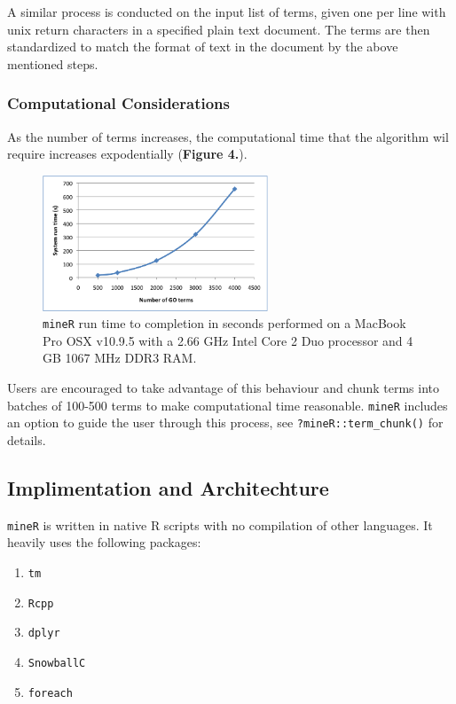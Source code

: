 \documentclass[twoside]{article}
\begin{document}
A similar process is conducted on the input list of terms, given one per line with unix return characters in a specified plain text document. The terms are then standardized to match the format of text in the document by the above mentioned steps.

\subsubsection{Computational Considerations}

As the number of terms increases, the computational time that the algorithm wil require increases expodentially (\textbf{Figure 4.}).

\begin{figure}[h]
\centering
\includegraphics[width=0.6\textwidth]{GO_np.png}
\caption{\texttt{mineR} run time to completion in seconds performed on a MacBook Pro OSX v10.9.5 with a 2.66 GHz Intel Core 2 Duo processor and 4 GB 1067 MHz DDR3 RAM.}
\end{figure}

Users are encouraged to take advantage of this behaviour and chunk terms into batches of 100-500 terms to make computational time reasonable. \texttt{mineR} includes an option to guide the user through this process, see \texttt{?mineR::term_chunk()} for details.

\subsection{Implimentation and Architechture}

\texttt{mineR} is written in native R scripts with no compilation of other languages. It heavily uses the following packages:

 \begin{enumerate}
\item \texttt{tm}
\item \texttt{Rcpp}
\item \texttt{dplyr}
\item \texttt{SnowballC}
\item \texttt{foreach}

\end{enumerate}
\end{document}
